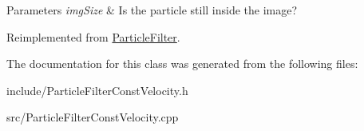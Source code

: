 \begin{DoxyParams}{Parameters}
{\em img\+Size} & Is the particle still inside the image? \\
\hline
\end{DoxyParams}


Reimplemented from \hyperlink{classParticleFilter_a166db9f33feabf14126df2de541a593d}{Particle\+Filter}.



The documentation for this class was generated from the following files\+:\begin{DoxyCompactItemize}
\item 
include/Particle\+Filter\+Const\+Velocity.\+h\item 
src/Particle\+Filter\+Const\+Velocity.\+cpp\end{DoxyCompactItemize}
